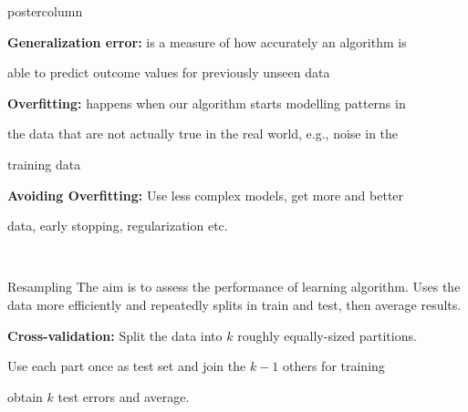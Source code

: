 \documentclass{beamer}
\newlength{\columnheight} %
\begin{document}
\begin{frame}[fragile]{}
\begin{columns}
\begin{column}{.31\textwidth}
		\begin{beamercolorbox}[center]{postercolumn}
			\begin{minipage}{.98\textwidth}
				\parbox[t][\columnheight]{\textwidth}{
				    \begin{myblock}{ }
							\begin{codebox}
							 \textbf{Generalization error: }is a measure of how accurately an algorithm is
						\end{codebox}
						\begin{codebox}
							  able to predict outcome values for previously unseen data
						\end{codebox}
						\hspace*{1ex}
						\begin{codebox}
							\textbf{Overfitting: }happens when our algorithm starts modelling patterns in
						\end{codebox}
						\begin{codebox}
							the data that are not actually true in the real world, e.g., noise in the
						\end{codebox}
						\begin{codebox}
						    training data
						\end{codebox}
						\hspace*{1ex}
						\begin{codebox}	
						\textbf{Avoiding Overfitting: }Use less complex models, get more and better
						\end{codebox}
						\begin{codebox}	
						 data, early stopping, regularization etc.
						\end{codebox}
				
						\\
						\end{myblock}
						\begin{myblock}{Resampling}
						The aim is to assess the performance of learning algorithm. Uses the data more efficiently and repeatedly splits in train and test, then average results.\\
						\begin{codebox}
							 \textbf{Cross-validation: }Split the data into $k$ roughly equally-sized partitions.
						\end{codebox}
						\begin{codebox}
						     Use each part once as test set and join the $k-1$ others for training
						\end{codebox}
						\begin{codebox}
						      obtain $k$ test errors and average.
						\end{codebox}
	

\end{myblock}}
\end{minipage}
\end{beamercolorbox}
\end{column}
\end{columns}
\end{frame}
\end{document}
